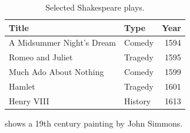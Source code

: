 \begin{table}[!t]
	\begin{center}
		\begin{threeparttable}
			\caption{Selected Shakespeare plays.}
			\label{tab:shakespeare-plays}
			\setlength{\defaultaddspace}{0.5em}
			\begin{tabular}{llr}
				\toprule
				Title & Type & Year \\
				\midrule
				A Midsummer Night's Dream\tnote{a} & Comedy & 1594 \\
				Romeo and Juliet & Tragedy & 1595 \\
				Much Ado About Nothing & Comedy & 1599 \\
				Hamlet & Tragedy & 1601 \\
				Henry VIII & History & 1613 \\
				\bottomrule
			\end{tabular}
			\begin{tablenotes}
				\item[a]  shows a 19th century painting by John Simmons.
			\end{tablenotes}
		\end{threeparttable}
	\end{center}
\end{table}